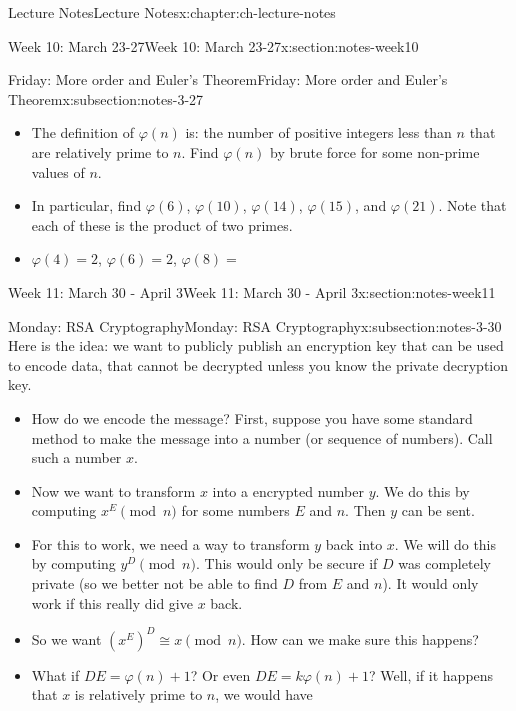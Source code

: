 \documentclass[oneside,11pt,]{book}
\begin{document}
\begin{chapterptx}{Lecture Notes}{}{Lecture Notes}{}{}{x:chapter:ch-lecture-notes}
\begin{sectionptx}{Week 10: March 23-27}{}{Week 10: March 23-27}{}{}{x:section:notes-week10}
\begin{subsectionptx}{Friday: More order and Euler's Theorem}{}{Friday: More order and Euler's Theorem}{}{}{x:subsection:notes-3-27}
\begin{itemize}[label=\textbullet]
\item{}The definition of \(\varphi(n)\) is: the number of positive integers less than \(n\) that are relatively prime to \(n\).  Find \(\varphi(n)\) by brute force for some non-prime values of \(n\).%
\item{}In particular, find \(\varphi(6)\), \(\varphi(10)\), \(\varphi(14)\), \(\varphi(15)\), and \(\varphi(21)\).  Note that each of these is the product of two primes.%
\item{}\(\varphi(4) = 2\), \(\varphi(6) = 2\), \(\varphi(8) = \)%
\end{itemize}
%
\end{subsectionptx}
\end{sectionptx}
%
%
\typeout{************************************************}
\typeout{************************************************}
%
\begin{sectionptx}{Week 11: March 30 - April 3}{}{Week 11: March 30 - April 3}{}{}{x:section:notes-week11}
%
%
\typeout{************************************************}
\typeout{************************************************}
%
\begin{subsectionptx}{Monday: RSA Cryptography}{}{Monday: RSA Cryptography}{}{}{x:subsection:notes-3-30}
Here is the idea: we want to publicly publish an encryption key that can be used to encode data, that cannot be decrypted unless you know the private decryption key.%
\begin{itemize}[label=\textbullet]
\item{}How do we encode the message? First, suppose you have some standard method to make the message into a number (or sequence of numbers). Call such a number \(x\).%
\item{}Now we want to transform \(x\) into a encrypted number \(y\). We do this by computing \(x^E \pmod{n}\) for some numbers \(E\) and \(n\). Then \(y\) can be sent.%
\item{}For this to work, we need a way to transform \(y\) back into \(x\). We will do this by computing \(y^D \pmod{n}\). This would only be secure if \(D\) was completely private (so we better not be able to find \(D\) from \(E\) and \(n\)). It would only work if this really did give \(x\) back.%
\item{}So we want \((x^E)^D \cong x \pmod{n}\). How can we make sure this happens?%
\item{}What if \(DE = \varphi(n)+1\)? Or even \(DE = k\varphi(n)+1\)? Well, if it happens that \(x\) is relatively prime to \(n\), we would have%

\end{itemize}
\end{subsectionptx}
\end{sectionptx}
\end{chapterptx}
\end{document}
